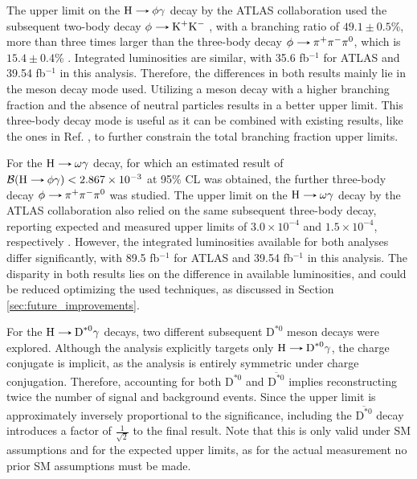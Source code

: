 The upper limit on the $\text{H}\decaysto \phi\gamma$ decay by the ATLAS collaboration used the subsequent two-body decay $\phi\decaysto \text{K}^+\text{K}^-$ \cite{ATLAS:2017gko}, with a branching ratio of $49.1\pm0.5$\%, more than three times larger than the three-body decay $\phi\decaysto \pi^+\pi^-\pi^0$, which is $15.4\pm0.4$\% \cite{PDG}. Integrated luminosities are similar, with 35.6 fb$^{-1}$ for ATLAS and 39.54 fb$^{-1}$ in this analysis. Therefore, the differences in both results mainly lie in the meson decay mode used. Utilizing a meson decay with a higher branching fraction and the absence of neutral particles results in a better upper limit. This three-body decay mode is useful as it can be combined with existing results, like the ones in Ref. \cite{ATLAS:2017gko}, to further constrain the total branching fraction upper limits.

For the $\text{H}\decaysto \omega\gamma$ decay, for which an estimated result of $\mathcal{B}(\text{H}\decaysto \phi\gamma) < 2.867 \times 10^{-3}$ at 95\% CL was obtained, the further three-body decay $\phi\decaysto \pi^+\pi^-\pi^0$ was studied. The upper limit on the $\text{H}\decaysto \omega\gamma$ decay by the ATLAS collaboration also relied on the same subsequent three-body decay, reporting expected and measured upper limits of $3.0 \times 10^{-4}$ and $1.5 \times 10^{-4}$, respectively \cite{ATLAS:2023alf}. However, the integrated luminosities available for both analyses differ significantly, with 89.5 fb$^{-1}$ for ATLAS and 39.54 fb$^{-1}$ in this analysis. The disparity in both results lies on the difference in available luminosities, and could be reduced optimizing the used techniques, as discussed in Section \ref{sec:future_improvements}.

For the $\text{H}\decaysto \text{D}^{*0}\gamma$ decays, two different subsequent $\text{D}^{*0}$ meson decays were explored. Although the analysis explicitly targets only $\text{H}\decaysto \text{D}^{*0}\gamma$, the charge conjugate is implicit, as the analysis is entirely symmetric under charge conjugation. Therefore, accounting for both $\text{D}^{*0}$ and $\overline{\text{D}^{*0}}$ implies reconstructing twice the number of signal and background events. Since the upper limit is approximately inversely proportional to the significance, including the $\overline{\text{D}^{*0}}$ decay introduces a factor of $\frac{1}{\sqrt{2}}$ to the final result. Note that this is only valid under SM assumptions and for the expected upper limits, as for the actual measurement no prior SM assumptions must be made.

